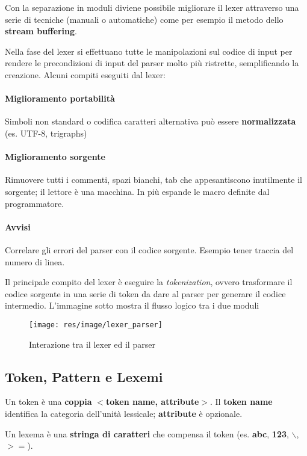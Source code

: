 Con la separazione in moduli diviene possibile migliorare il lexer attraverso
una serie di tecniche (manuali o automatiche) come per esempio il metodo dello
\textbf{stream buffering}.

Nella fase del lexer si effettuano tutte le manipolazioni sul codice di input
per rendere le precondizioni di input del parser molto più ristrette,
semplificando la creazione. Alcuni compiti eseguiti dal lexer:

\paragraph{Miglioramento portabilità}
Simboli non standard o codifica caratteri alternativa può essere
\textbf{normalizzata} (es. UTF-8, trigraphs)
\paragraph{Miglioramento sorgente}
Rimuovere tutti i commenti, spazi bianchi, tab che appesantiscono inutilmente
il sorgente; il lettore è una macchina. In più espande le macro definite dal
programmatore.
\paragraph{Avvisi}
Correlare gli errori del parser con il codice sorgente. Esempio tener traccia
del numero di linea.

Il principale compito del lexer è eseguire la \textit{tokenization}, ovvero
trasformare il codice sorgente in una serie di token da dare al parser per
generare il codice intermedio. L'immagine sotto mostra il flusso logico tra i
due moduli
\begin{figure}[H]
\texttt{[image: res/image/lexer\_parser]}
\caption{Interazione tra il lexer ed il parser}
\label{img:lexer_parser}
\end{figure}

\subsection{Token, Pattern e Lexemi}
\label{sec:token_pattern_lexemi}
\begin{definition}[Token]
Un token è una \textbf{coppia} \textbf{$<$token name, attribute$>$}. Il
\textbf{token name} identifica la categoria dell'unità lessicale;
\textbf{attribute} è opzionale.
\end{definition}

\begin{definition}[Lexeme]
Un lexema è una \textbf{stringa di caratteri} che compensa il token
(es. \textbf{abc}, \textbf{123}, $\backslash$, $>=$).
\end{definition}

